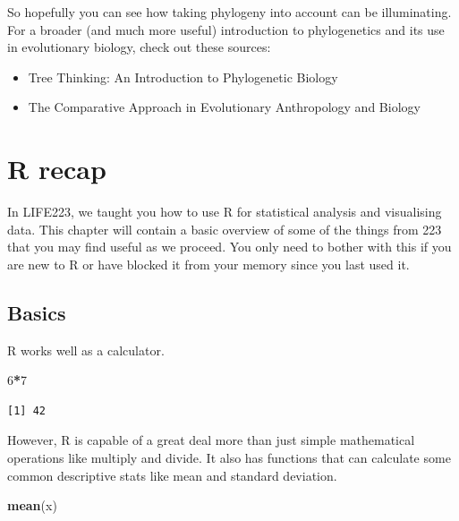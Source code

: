 \documentclass[
]{book}
\newenvironment{Shaded}{\begin{snugshade}}{\end{snugshade}}
\newcommand{\DecValTok}[1]{\textcolor[rgb]{0.00,0.00,0.81}{#1}}
\newcommand{\KeywordTok}[1]{\textcolor[rgb]{0.13,0.29,0.53}{\textbf{#1}}}
\newcommand{\NormalTok}[1]{#1}
\newcommand{\OperatorTok}[1]{\textcolor[rgb]{0.81,0.36,0.00}{\textbf{#1}}}
\providecommand{\tightlist}{%
  \setlength{\itemsep}{0pt}\setlength{\parskip}{0pt}}
\begin{document}
So hopefully you can see how taking phylogeny into account can be illuminating. For a broader (and much more useful) introduction to phylogenetics and its use in evolutionary biology, check out these sources:

\begin{itemize}
\tightlist
\item
  Tree Thinking: An Introduction to Phylogenetic Biology \citep{baum12}
\item
  The Comparative Approach in Evolutionary Anthropology and Biology \citep{Nunn11}
\end{itemize}

\hypertarget{recap}{%
\chapter{R recap}\label{recap}}

In LIFE223, we taught you how to use R for statistical analysis and visualising data. This chapter will contain a basic overview of some of the things from 223 that you may find useful as we proceed. You only need to bother with this if you are new to R or have blocked it from your memory since you last used it.

\hypertarget{basics}{%
\section{Basics}\label{basics}}

R works well as a calculator.

\begin{Shaded}
\begin{Highlighting}[]
\DecValTok{6}\OperatorTok{*}\DecValTok{7}
\end{Highlighting}
\end{Shaded}

\begin{verbatim}
[1] 42
\end{verbatim}

However, R is capable of a great deal more than just simple mathematical operations like multiply and divide. It also has functions that can calculate some common descriptive stats like mean and standard deviation.

\begin{Shaded}
\begin{Highlighting}[]
\KeywordTok{mean}\NormalTok{(x)}
\end{Highlighting}
\end{Shaded}
\end{document}
